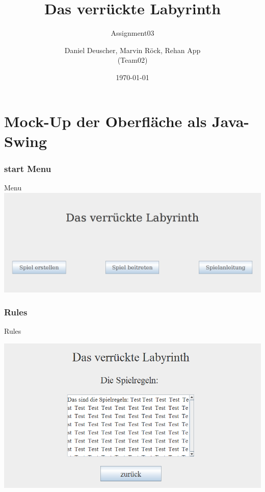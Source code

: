 \documentclass{beamer}
\begin{document}
	\title[]{Das verrückte Labyrinth}	
	\subtitle{Assignment03}
	\author{Daniel Deuscher, Marvin Röck, Rehan App\\ (Team02)}
	\date{\today}
	 
	\begin{frame}
		\maketitle
	\end{frame}
	
		\section{Mock-Up der Oberfläche als Java-Swing}
		    \label{Frame1}	
			\begin{frame}
				\frametitle{start Menu}
				\begin{block}{Menu}
					\includegraphics[scale=0.25]{Bilder/bild1.png}
				\end{block}		
			\end{frame}
			\label{Frame2}	
			\begin{frame}
				\frametitle{Rules}
				\begin{block}{Rules}
					\begin{center}
						\includegraphics[scale=0.57]{Bilder/bild7.png}
					\end{center}
					
				\end{block}		
			\end{frame}	
\end{document}
